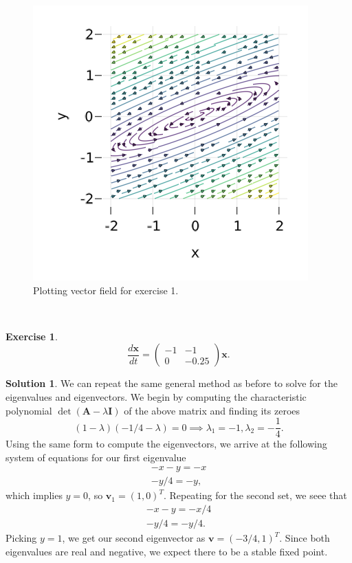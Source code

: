 \documentclass[12pt]{article}
\renewcommand{\vec}[1]{\mathbf{#1}}
\theoremstyle{definition}
\newtheorem{exer}{Exercise}
\newtheorem{sol}{Solution}
\theoremstyle{remark}
\begin{document}
 \begin{figure}[h]
     \centering
     \includegraphics[width=0.8\linewidth]{figs/hw-1-exer-1.png}
     \caption{Plotting vector field for exercise 1.}%
     \label{fig:exer-1}
 \end{figure}

\newpage
 
\

\newpage

\begin{exer}
\begin{equation*}
\frac{d \vec{x}}{dt} 
=
\begin{pmatrix}
    -1 & -1\\
    0 & -0.25
\end{pmatrix}
\vec{x}.
\end{equation*}
\end{exer}

\begin{sol}\leavevmode
    We can repeat the same general method as before to solve for the eigenvalues and eigenvectors. We begin by computing the characteristic polynomial $\det( \vec{A} - \lambda \vec{I} )$  of the above matrix and finding its zeroes
    \begin{equation*}
        (1-\lambda)(- 1 / 4 - \lambda) = 0 \implies \lambda_{1} = -1, \lambda_{2} = - \frac{1}{4}.
    \end{equation*}
    Using the same form to compute the eigenvectors, we arrive at the following system of equations for our first eigenvalue
    \begin{align*}
    - x - y = - x\\
    - y / 4  = - y,
    \end{align*}
    which implies $y = 0$, so $\vec{v}_{1} = (1, 0)^{T}$. Repeating for the second set, we seee that
    \begin{align*}
    -x - y = - x /4  \\
    - y / 4  = - y / 4 .
    \end{align*}
    Picking $y = 1$, we get our second eigenvector as $\vec{v} = (- 3 / 4 , 1)^{T}$. Since both eigenvalues are real and negative, we expect there to be a stable fixed point.
 \end{sol}
\end{document}

